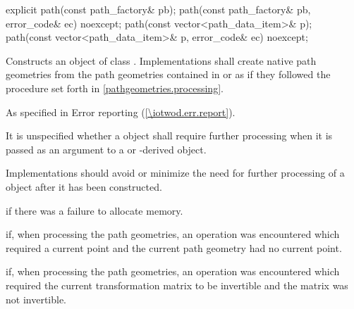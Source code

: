 \begin{itemdecl}
    explicit path(const path_factory& pb);
    path(const path_factory& pb, error_code& ec) noexcept;
    path(const vector<path_data_item>& p);
    path(const vector<path_data_item>& p, error_code& ec) noexcept;
\end{itemdecl}
\begin{itemdescr}
	\pnum
	\effects
	Constructs an object of class . Implementations shall create native path geometries from the path geometries contained in  or  as if they followed the procedure set forth in \ref{pathgeometries.processing}.

	\pnum
	\throws
	As specified in Error reporting (\ref{\iotwod.err.report}).

	\pnum
	\remarks
	It is unspecified whether a  object shall require further processing when it is passed as an argument to a  or -derived object.
	
	\pnum
	Implementations should avoid or minimize the need for further processing of a  object after it has been constructed.

	\pnum
	\errors
	 if there was a failure to allocate memory.
	
	\pnum
	 if, when processing the path geometries, an operation was encountered which required a current point and the current path geometry had no current point.
	
	\pnum
	 if, when processing the path geometries, an operation was encountered which required the current transformation matrix to be invertible and the matrix was not invertible.
	
\end{itemdescr}
